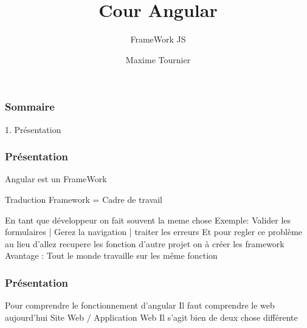 \documentclass[10pt]{beamer}
\title[Angular]
{Cour Angular}
\subtitle{FrameWork JS}
\author[Maxime Tournier]
{Maxime Tournier}
\date[21/08/2023]
\begin{document}
	\frame{\titlepage}
%
%
%
%
%

	\begin{frame}
		\frametitle{Sommaire}

		1. {Présentation}


	\end{frame}

	\begin{frame}
		\frametitle{Présentation}
	
		Angular est un FrameWork

		\begin{block}{Traduction}
			Framework = Cadre de travail
		\end{block}

		En tant que développeur on fait souvent la meme chose \newline \newline
		Exemple: \newline Valider les formulaires | Gerez la navigation | traiter les erreurs
		\newline \newline
		Et pour regler ce problème au lieu d'allez recupere les fonction d'autre projet on à créer les framework
		\newline \newline
		Avantage : Tout le monde travaille sur les même fonction
		
	\end{frame}

	\begin{frame}
		\frametitle{Présentation}

		Pour comprendre le fonctionnement d'angular
		\newline \newline
		Il faut comprendre le web aujourd'hui
		\newline \newline
		Site Web / Application Web
		\newline \newline
		Il s'agit bien de deux chose différente

	\end{frame}
\end{document}
